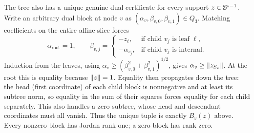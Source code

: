 The tree also has a unique genuine dual certificate for every support
$z\in\mathbb S^{s-1}$. Write an arbitrary dual block at node $v$
as $(\alpha_v,\beta_{v,0},\beta_{v,1})\in Q_3$. Matching coefficients on
the entire affine slice forces
\[
 \alpha_{\mathrm{root}}=1,\qquad
 \beta_{v,j}=\begin{cases}
 -z_\ell,&\text{if child }v_j\text{ is leaf }\ell,\\
 -\alpha_{v_j},&\text{if child }v_j\text{ is internal}.
 \end{cases}
\]
Induction from the leaves, using
$\alpha_v\geq(\beta_{v,0}^2+\beta_{v,1}^2)^{1/2}$, gives
$\alpha_v\geq\lVert z_{S_v}\rVert$. At the root this is equality because
$\lVert z\rVert=1$. Equality then propagates down the tree: the head
(first coordinate) of each child block is nonnegative and at least its
subtree norm, so equality in the sum
of their squares forces equality for each child separately. This also
handles a zero subtree, whose head and descendant coordinates must all
vanish. Thus the unique tuple is exactly $B_v(z)$ above. Every nonzero
block has Jordan rank one; a zero block has rank zero.

